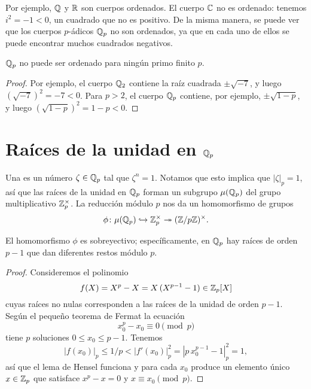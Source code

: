 \documentclass{article}
\numberwithin{equation}{section}
\theoremstyle{definition}
\begin{document}
Por ejemplo, $\mathbb{Q}$ y $\mathbb{R}$ son cuerpos ordenados. El cuerpo $\mathbb{C}$ no es
ordenado: tenemos $i^2 = -1 < 0$, un cuadrado que no es positivo. De la misma
manera, se puede ver que los cuerpos $p$-ádicos $\mathbb{Q}_p$ no son ordenados, ya que
en cada uno de ellos se puede encontrar muchos cuadrados negativos.

\begin{observacion}
  $\mathbb{Q}_p$ no puede ser ordenado para ningún primo finito $p$.

  \begin{proof}
    Por ejemplo, el cuerpo $\mathbb{Q}_2$ contiene la raíz cuadrada $\pm\sqrt{-7}$,
    y luego $(\sqrt{-7})^2 = -7 < 0$. Para $p > 2$, el cuerpo $\mathbb{Q}_p$ contiene,
    por ejemplo, $\pm\sqrt{1-p}$, y luego $(\sqrt{1-p})^2 = 1-p < 0$.
  \end{proof}
\end{observacion}


\section{Raíces de la unidad en $\mathbb{Q}_p$}

Una  es un número $\zeta \in \mathbb{Q}_p$ tal que
$\zeta^n = 1$. Notamos que esto implica que $|\zeta|_p = 1$, así que las raíces
de la unidad en $\mathbb{Q}_p$ forman un subgrupo $\mu (\mathbb{Q}_p)$ del grupo
multiplicativo $\mathbb{Z}_p^\times$. La reducción módulo $p$ nos da un homomorfismo
de grupos
\begin{equation}
  \label{eqn:reduccion-mod-p-de-raices-de-unidad}
  \phi\colon \mu (\mathbb{Q}_p) \hookrightarrow \mathbb{Z}_p^\times \twoheadrightarrow (\mathbb{Z}/p\mathbb{Z})^\times.
\end{equation}

\begin{proposicion}
  El homomorfismo $\phi$ es sobreyectivo; específicamente, en $\mathbb{Q}_p$ hay raíces
  de orden $p-1$ que dan diferentes restos módulo $p$.

  \begin{proof}
    Consideremos el polinomio
    $$f (X) = X^p - X = X\,(X^{p-1} - 1) \in \mathbb{Z}_p [X]$$
    cuyas raíces no nulas corresponden a las raíces de la unidad de orden
    $p-1$. Según el pequeño teorema de Fermat la ecuación
    $$x_0^p - x_0 \equiv 0 \pmod{p}$$
    tiene $p$ soluciones $0 \le x_0 \le p-1$. Tenemos
    $$|f (x_0)|_p \le 1/p < |f' (x_0)|_p^2 = |p\,x_0^{p-1} - 1|_p^2 = 1,$$
    así que el lema de Hensel funciona y para cada $x_0$ produce un elemento
    único $x\in\mathbb{Z}_p$ que satisface $x^p - x = 0$ y $x \equiv x_0 \pmod{p}$.
  \end{proof}
\end{proposicion}
\end{document}
